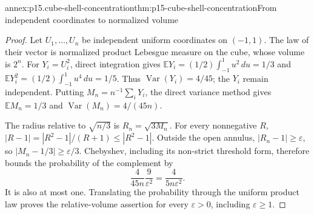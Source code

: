 \begin{annexitem}{annex:p15.cube-shell-concentration}{thm:p15-cube-shell-concentration}{From independent coordinates to normalized volume}
\begin{proof}
Let \(U_1,\ldots,U_n\) be independent uniform coordinates on
\((-1,1)\). The law of their vector is normalized product Lebesgue
measure on the cube, whose volume is \(2^n\).
For \(Y_i=U_i^2\), direct integration gives
\(\mathbb EY_i=(1/2)\int_{-1}^1u^2\,du=1/3\) and
\(\mathbb EY_i^2=(1/2)\int_{-1}^1u^4\,du=1/5\).
Thus \(\operatorname{Var}(Y_i)=4/45\); the \(Y_i\) remain independent.
Putting \(M_n=n^{-1}\sum_iY_i\), the direct variance method gives
\(\mathbb EM_n=1/3\) and \(\operatorname{Var}(M_n)=4/(45n)\).

The radius relative to \(\sqrt{n/3}\) is \(R_n=\sqrt{3M_n}\).
For every nonnegative \(R\),
\(|R-1|=|R^2-1|/(R+1)\leq|R^2-1|\).
Outside the open annulus, \(|R_n-1|\geq\varepsilon\), so
\(|M_n-1/3|\geq\varepsilon/3\).
Chebyshev, including its non-strict threshold form, therefore bounds
the probability of the complement by
\[
 \frac{4}{45n}\frac{9}{\varepsilon^2}
       =\frac{4}{5n\varepsilon^2}.
\]
It is also at most one. Translating the probability through the
uniform product law proves the relative-volume assertion for every
\(\varepsilon>0\), including \(\varepsilon\geq1\).
\end{proof}
\end{annexitem}

